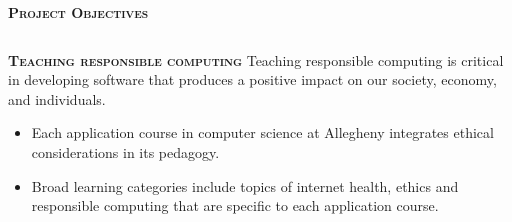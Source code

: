 \documentclass[final,t]{beamer}
\begin{document}
\begin{frame}{}
\begin{columns}[t]
\begin{column}{1\linewidth}
\begin{block}{\textsc{\textbf{Project Objectives}}}
\begin{itemize}
				\end{itemize}

                    \vspace*{6mm}
                \end{block}
			\end{column}
		\end{columns}


		\begin{columns}

%
%
            \begin{column}{.5\linewidth}
%
%
			\begin{block}{\textsc{\textbf{Teaching responsible computing}}}
				\vspace*{3mm}
Teaching responsible computing is critical in developing software that produces a positive impact on our society, economy, and individuals.
				\begin{itemize}
					\item  Each application course in computer science at Allegheny integrates ethical considerations in its pedagogy.
					\item Broad learning categories include topics of internet health, ethics and responsible computing that are specific to each application course. 

\end{itemize}
\end{block}
\end{column}
\end{columns}
\end{frame}
\end{document}

